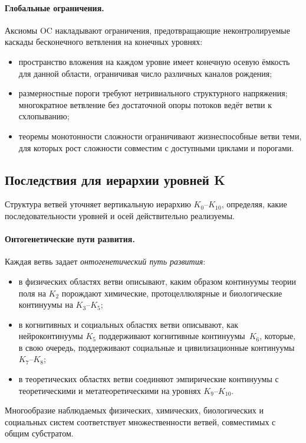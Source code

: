 \paragraph{Глобальные ограничения.}
Аксиомы OC накладывают ограничения, предотвращающие неконтролируемые
каскады бесконечного ветвления на конечных уровнях:
\begin{itemize}
  \item пространство вложения на каждом уровне имеет конечную осевую ёмкость для
        данной области, ограничивая число различных каналов рождения;
  \item размерностные пороги требуют нетривиального структурного
        напряжения; многократное ветвление без достаточной опоры потоков
        ведёт ветви к схлопыванию;
  \item теоремы монотонности сложности ограничивают жизнеспособные ветви теми,
        для которых рост сложности совместим с доступными циклами и порогами.
\end{itemize}

\subsection{Последствия для иерархии уровней K}

Структура ветвей уточняет вертикальную иерархию \(K_0\)–\(K_{10}\), определяя,
какие последовательности уровней и осей действительно реализуемы.

\paragraph{Онтогенетические пути развития.}
Каждая ветвь задает \emph{онтогенетический путь развития}:
\begin{itemize}
  \item в физических областях ветви описывают, каким образом континуумы
        теории поля на \(K_2\) порождают химические, протоцеллюлярные и
        биологические континуумы на \(K_3\)–\(K_5\);
  \item в когнитивных и социальных областях ветви описывают, как
        нейроконтинуумы \(K_5\) поддерживают когнитивные континуумы\,
        \(K_6\), которые, в свою очередь, поддерживают социальные и
        цивилизационные континуумы \(K_7\)–\(K_8\);
  \item в теоретических областях ветви соединяют эмпирические континуумы
        с теоретическими и метатеоретическими на уровнях \(K_9\)–\(K_{10}\).
\end{itemize}
Многообразие наблюдаемых физических, химических, биологических и социальных
систем соответствует множественности ветвей, совместимых с общим субстратом.

